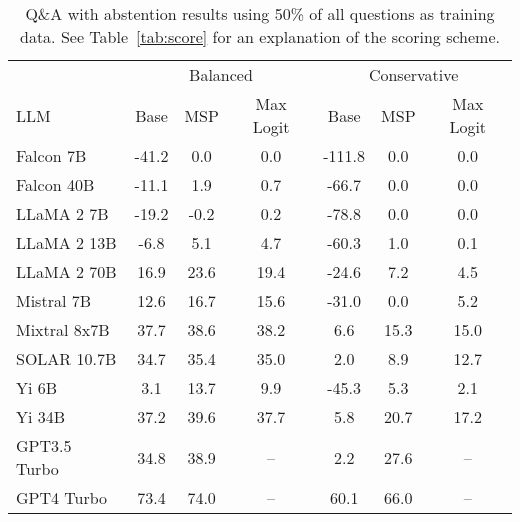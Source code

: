 \begin{table*}[h]
\centering
\caption{Q\&A with abstention results using 50\% of all questions as training data. See Table~\ref{tab:score} for an explanation of the scoring scheme.}
\label{tab:score_k=half}
\begin{tabular}{lcccccc}
\toprule
& \multicolumn{3}{c}{Balanced} & \multicolumn{3}{c}{Conservative} \\ 
LLM & Base & MSP & Max Logit & Base & MSP & Max Logit \\ 
\cmidrule(lr){1-1}\cmidrule(lr){2-4}\cmidrule(lr){5-7} 
Falcon 7B & -41.2 & 0.0 & 0.0 & -111.8 & 0.0 & 0.0\\
Falcon 40B & -11.1 & 1.9 & 0.7 & -66.7 & 0.0 & 0.0\\
LLaMA 2 7B & -19.2 & -0.2 & 0.2 & -78.8 & 0.0 & 0.0\\
LLaMA 2 13B & -6.8 & 5.1 & 4.7 & -60.3 & 1.0 & 0.1\\
LLaMA 2 70B & 16.9 & 23.6 & 19.4 & -24.6 & 7.2 & 4.5\\
Mistral 7B & 12.6 & 16.7 & 15.6 & -31.0 & 0.0 & 5.2\\
Mixtral 8x7B & 37.7 & 38.6 & 38.2 & 6.6 & 15.3 & 15.0\\
SOLAR 10.7B & 34.7 & 35.4 & 35.0 & 2.0 & 8.9 & 12.7\\
Yi 6B & 3.1 & 13.7 & 9.9 & -45.3 & 5.3 & 2.1\\
Yi 34B & 37.2 & 39.6 & 37.7 & 5.8 & 20.7 & 17.2\\
GPT3.5 Turbo & 34.8 & 38.9 & -- & 2.2 & 27.6 & --\\
GPT4 Turbo & 73.4 & 74.0 & -- & 60.1 & 66.0 & --\\
\bottomrule
\end{tabular}
\end{table*}
